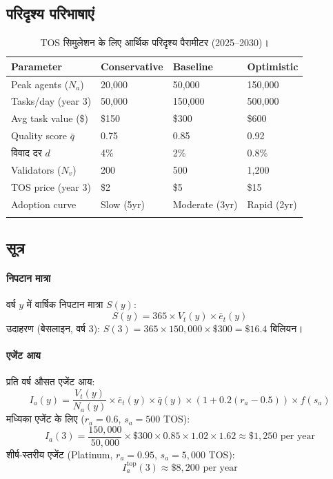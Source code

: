 \documentclass[11pt]{article}
\begin{document}
\begin{itemize}[noitemsep]
\begin{itemize}[noitemsep]
\subsection{परिदृश्य परिभाषाएं}
\begin{longtable}{@{}p{}p{}p{}p{}@{}}
\toprule
\textbf{Parameter} & \textbf{Conservative} & \textbf{Baseline} & \textbf{Optimistic} \\\midrule
Peak agents ($N_a$) & 20,000 & 50,000 & 150,000 \\
Tasks/day (year 3) & 50,000 & 150,000 & 500,000 \\
Avg task value (\$) & \$150 & \$300 & \$600 \\
Quality score $\bar{q}$ & 0.75 & 0.85 & 0.92 \\
विवाद दर $d$ & 4\% & 2\% & 0.8\% \\
Validators ($N_v$) & 200 & 500 & 1,200 \\
TOS price (year 3) & \$2 & \$5 & \$15 \\
Adoption curve & Slow (5yr) & Moderate (3yr) & Rapid (2yr) \\\bottomrule
\caption{TOS सिमुलेशन के लिए आर्थिक परिदृश्य पैरामीटर (2025--2030)।}
\label{tab:econ-scenarios}
\end{longtable}

\subsection{सूत्र}
\paragraph{निपटान मात्रा} वर्ष $y$ में वार्षिक निपटान मात्रा $S(y)$:
\begin{equation}
S(y) = 365 \times V_t(y) \times \bar{e}_t(y)
\end{equation}
उदाहरण (बेसलाइन, वर्ष 3): $S(3) = 365 \times 150{,}000 \times \$300 = \$16.4$ बिलियन।

\paragraph{एजेंट आय} प्रति वर्ष औसत एजेंट आय:
\begin{equation}
I_a(y) = \frac{V_t(y)}{N_a(y)} \times \bar{e}_t(y) \times \bar{q}(y) \times (1 + 0.2(r_a - 0.5)) \times f(s_a)
\end{equation}
मध्यिका एजेंट के लिए ($r_a = 0.6$, $s_a = 500$ TOS):
\begin{equation}
I_a(3) = \frac{150{,}000}{50{,}000} \times \$300 \times 0.85 \times 1.02 \times 1.62 \approx \$1{,}250 \text{ per year}
\end{equation}
शीर्ष-स्तरीय एजेंट (Platinum, $r_a = 0.95$, $s_a = 5{,}000$ TOS):
\begin{equation}
I_a^{\text{top}}(3) \approx \$8{,}200 \text{ per year}
\end{equation}


\end{itemize}
\end{itemize}
\end{document}
